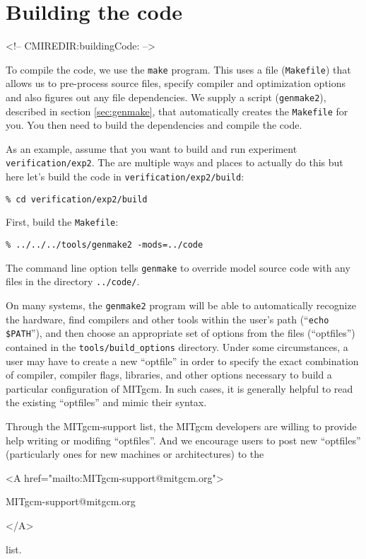 \section[Building MITgcm]{Building the code}
\label{sec:buildingCode}
\begin{rawhtml}
<!-- CMIREDIR:buildingCode: -->
\end{rawhtml}

To compile the code, we use the \texttt{make} program. This uses a
file (\texttt{Makefile}) that allows us to pre-process source files,
specify compiler and optimization options and also figures out any
file dependencies. We supply a script (\texttt{genmake2}), described
in section \ref{sec:genmake}, that automatically creates the
\texttt{Makefile} for you. You then need to build the dependencies and
compile the code.

As an example, assume that you want to build and run experiment
\texttt{verification/exp2}. The are multiple ways and places to
actually do this but here let's build the code in
\texttt{verification/exp2/build}:
\begin{verbatim}
% cd verification/exp2/build
\end{verbatim}
First, build the \texttt{Makefile}:
\begin{verbatim}
% ../../../tools/genmake2 -mods=../code
\end{verbatim}
The command line option tells \texttt{genmake} to override model source
code with any files in the directory \texttt{../code/}.

On many systems, the \texttt{genmake2} program will be able to
automatically recognize the hardware, find compilers and other tools
within the user's path (``\texttt{echo \$PATH}''), and then choose an
appropriate set of options from the files (``optfiles'') contained in
the \texttt{tools/build\_options} directory.  Under some
circumstances, a user may have to create a new ``optfile'' in order to
specify the exact combination of compiler, compiler flags, libraries,
and other options necessary to build a particular configuration of
MITgcm.  In such cases, it is generally helpful to read the existing
``optfiles'' and mimic their syntax.

Through the MITgcm-support list, the MITgcm developers are willing to
provide help writing or modifing ``optfiles''.  And we encourage users
to post new ``optfiles'' (particularly ones for new machines or
architectures) to the 
\begin{rawhtml} <A href="mailto:MITgcm-support@mitgcm.org"> \end{rawhtml}
MITgcm-support@mitgcm.org
\begin{rawhtml} </A> \end{rawhtml}
list.

